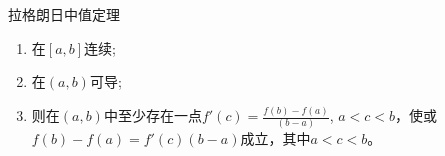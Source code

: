\begin{appendices}
\begin{mytheo}[label=myownlabel]{拉格朗日中值定理}{}
\begin{enumerate}[label=(\arabic*)]
  \item 在$[a,b]$连续;
  \item 在$(a,b)$可导;
  \item 则在$(a,b)$中至少存在一点$f'(c)=\displaystyle \frac{f(b)-f(a)}{(b-a)}$, $a<c<b$，使或$f(b)-f(a)=f'(c)(b-a)$成立，其中$a<c<b$。
\end{enumerate}
\end{mytheo}

% 

% 

% 

\end{appendices}